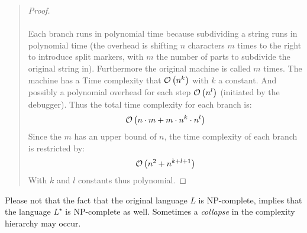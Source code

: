 \documentclass{article}
\begin{document}
\begin{exercise}
\begin{answer}
\begin{quote}
\begin{proof}
\paragraph{}
Each branch runs in polynomial time because subdividing a string runs in polynomial time (the overhead is shifting $n$ characters $m$ times to the right to introduce split markers, with $m$ the number of parts to subdivide the original string in). Furthermore the original machine is called $m$ times. The machine has a Time complexity that $\mathcal{O}\left( n^k \right)$ with $k$ a constant. And possibly a polynomial overhead for each step $\mathcal{O}\left( n^l \right)$ (initiated by the debugger). Thus the total time complexity for each branch is:
\begin{equation}
\mathcal{O}\left( n\cdot m+m\cdot n^k\cdot n^l \right)
\end{equation}
Since the $m$ has an upper bound of $n$, the time complexity of each branch is restricted by:
\begin{equation}
\mathcal{O}\left( n^2+n^{k+l+1} \right)
\end{equation}
With $k$ and $l$ constants thus polynomial.
\end{proof}\end{quote}
Please not that the fact that the original language $L$ is NP-complete, implies that the language $L^{\star}$ is NP-complete as well. Sometimes a \emph{collapse} in the complexity hierarchy may occur.
\end{answer}
\end{exercise}
\end{document}
